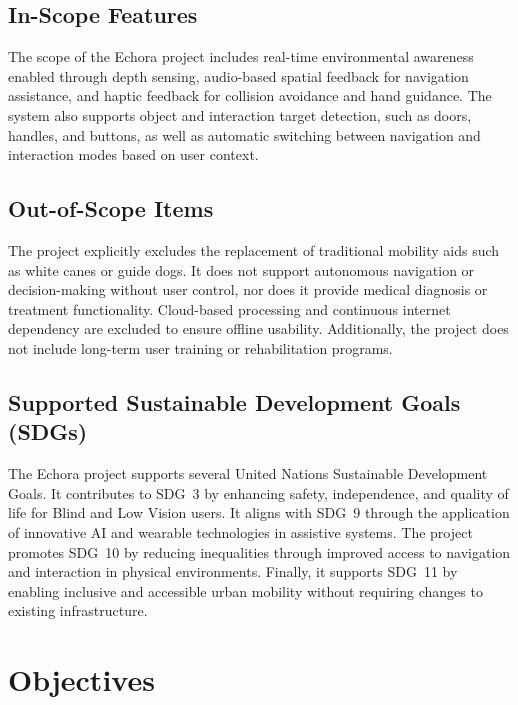 \subsection{In-Scope Features}
\label{subsubsec:in_scope_features}

The scope of the Echora project includes real-time environmental awareness enabled through depth sensing, audio-based spatial feedback for navigation assistance, and haptic feedback for collision avoidance and hand guidance. The system also supports object and interaction target detection, such as doors, handles, and buttons, as well as automatic switching between navigation and interaction modes based on user context.

\subsection{Out-of-Scope Items}
\label{subsubsec:out_of_scope}

The project explicitly excludes the replacement of traditional mobility aids such as white canes or guide dogs. It does not support autonomous navigation or decision-making without user control, nor does it provide medical diagnosis or treatment functionality. Cloud-based processing and continuous internet dependency are excluded to ensure offline usability. Additionally, the project does not include long-term user training or rehabilitation programs.

\subsection{Supported Sustainable Development Goals (SDGs)}
\label{subsubsec:sdgs}

The Echora project supports several United Nations Sustainable Development Goals. It contributes to SDG~3 by enhancing safety, independence, and quality of life for Blind and Low Vision users. It aligns with SDG~9 through the application of innovative AI and wearable technologies in assistive systems. The project promotes SDG~10 by reducing inequalities through improved access to navigation and interaction in physical environments. Finally, it supports SDG~11 by enabling inclusive and accessible urban mobility without requiring changes to existing infrastructure.

\section{Objectives}
\label{subsec:objectives}

